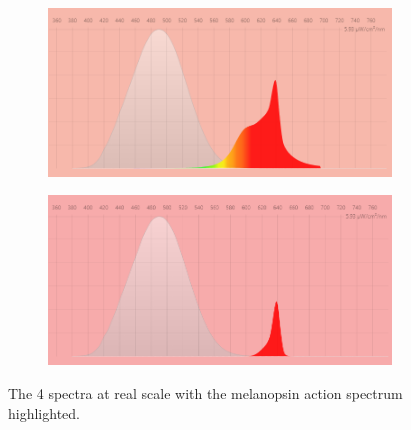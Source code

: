 \begin{figure}[bt]
\begin{subfigure}[h]{0.45\textwidth}
	\includegraphics[width=\textwidth]{Images/Spectra/EV.png}
\end{subfigure}
\begin{subfigure}[h]{0.45\textwidth}
	\includegraphics[width=\textwidth]{Images/Spectra/NX.png}
\end{subfigure}
\caption{The 4 spectra at real scale with the melanopsin action spectrum highlighted.}
\label{Fig:Flux}
\end{figure}


